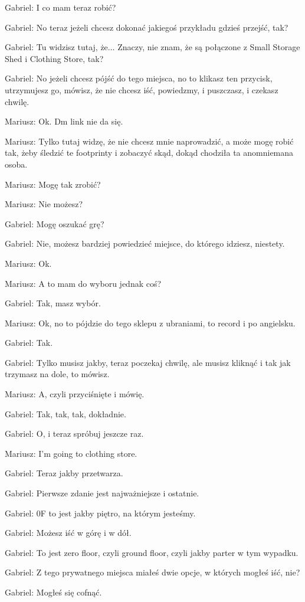 Gabriel: I co mam teraz robić?

Gabriel: No teraz jeżeli chcesz dokonać jakiegoś przykładu gdzieś przejść, tak?

Gabriel: Tu widzisz tutaj, że... Znaczy, nie znam, że są połączone z Small Storage Shed i Clothing Store, tak?

Gabriel: No jeżeli chcesz pójść do tego miejsca, no to klikasz ten przycisk, utrzymujesz go, mówisz, że nie chcesz iść, powiedzmy, i puszczasz, i czekasz chwilę.

Mariusz: Ok. Dm link nie da się.

Mariusz: Tylko tutaj widzę, że nie chcesz mnie naprowadzić, a może mogę robić tak, żeby śledzić te footprinty i zobaczyć skąd, dokąd chodziła ta anomniemana osoba.

Mariusz: Mogę tak zrobić?

Mariusz: Nie możesz?

Gabriel: Mogę oszukać grę?

Gabriel: Nie, możesz bardziej powiedzieć miejsce, do którego idziesz, niestety.

Mariusz: Ok.

Mariusz: A to mam do wyboru jednak coś?

Gabriel: Tak, masz wybór.

Mariusz: Ok, no to pójdzie do tego sklepu z ubraniami, to record i po angielsku.

Gabriel: Tak.

Gabriel: Tylko musisz jakby, teraz poczekaj chwilę, ale musisz kliknąć i tak jak trzymasz na dole, to mówisz.

Mariusz: A, czyli przyciśnięte i mówię.

Gabriel: Tak, tak, tak, dokładnie.

Gabriel: O, i teraz spróbuj jeszcze raz.

Mariusz: I'm going to clothing store.

Gabriel: Teraz jakby przetwarza.

Gabriel: Pierwsze zdanie jest najważniejsze i ostatnie.

Gabriel: 0F to jest jakby piętro, na którym jesteśmy.

Gabriel: Możesz iść w górę i w dół.

Gabriel: To jest zero floor, czyli ground floor, czyli jakby parter w tym wypadku.

Gabriel: Z tego prywatnego miejsca miałeś dwie opcje, w których mogłeś iść, nie?

Gabriel: Mogłeś się cofnąć.

